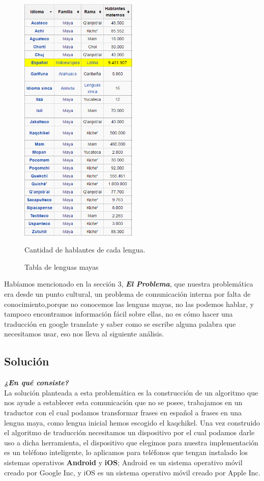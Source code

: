 \documentclass[a4paper,openright,11pt]{article}
\begin{document}
\begin{figure}[H]
	\centering
	\includegraphics[width=0.5\textwidth]{tablalenguas}
	\caption{Tabla de lenguas mayas}
	Cantidad de hablantes de cada lengua.
	\label{fig:tabla}
\end{figure}

Habíamos mencionado en la sección 3, \textbf{\textit{El Problema}}, que nuestra problemática era desde un punto cultural, un problema de comunicación interna por falta de conocimiento,porque no conocemos las lenguas mayas, no las podemos hablar, y tampoco encontramos información fácil sobre ellas, no es cómo hacer una traducción en google translate y saber como se escribe alguna palabra que necesitamos usar, eso nos lleva al siguiente análisis.

\subsection{Solución}
\textbf{\textit{¿En qué consiste?}}\\
La solución planteada a esta problemática es la construcción de un algoritmo que nos ayude a establecer esta comunicación que no se posee, trabajamos en un traductor con el cual podamos transformar frases en español a frases en una lengua maya, como lengua inicial hemos escogido el kaqchikel. Una vez construido el algoritmo de traducción necesitamos un dispositivo por el cual podamos darle uso a dicha herramienta, el dispositivo que elegimos para nuestra implementación es un teléfono inteligente, lo aplicamos para teléfonos que tengan instalado los sistemas operativos \textbf{Android} y \textbf{iOS}; Android es un sistema operativo móvil creado por Google Inc, y iOS es un sistema operativo móvil creado por Apple Inc.\\
\end{document}
